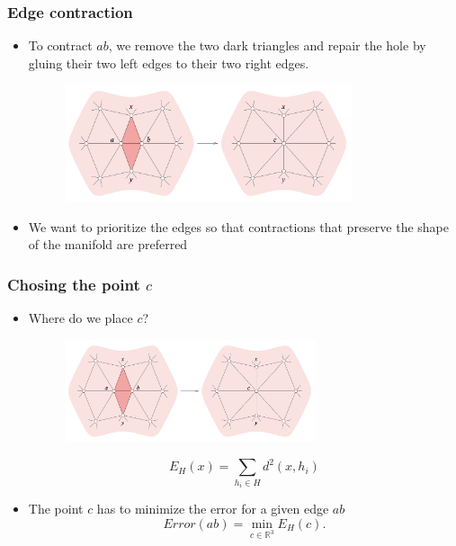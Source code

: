 \documentclass{beamer}
\begin{document}
\begin{frame}[t]
    \frametitle{Edge contraction}
    \begin{itemize}
        \item To contract $ab$, we remove the two dark triangles and repair the hole
        by gluing their two left edges to their two right edges.
        \begin{figure}[h]
            \begin{center}
            \includegraphics[width=0.8\textwidth]{edge_contract.png}
            \end{center}
        \end{figure}
        \item We want to prioritize the edges so that contractions that preserve
        the shape of the manifold are preferred
    \end{itemize}
\end{frame}
\begin{frame}[t]
    \frametitle{Chosing the point $c$}
    \begin{itemize}
    
        \item Where do we place $c$?
        \begin{figure}[h]
            \begin{center}
                \includegraphics[width=0.7\textwidth]{edge_contract.png}
            \end{center}
        \end{figure}
        \[E_H(x) = \sum_{h_i \in H} d^2(x, h_i)\]
        \item The point $c$ has to minimize the error for a given edge $ab$
        \[Error(ab) = \min_{c\in \mathbb{R}^3} E_H(c).\]
    \end{itemize}
\end{frame}
\end{document}
